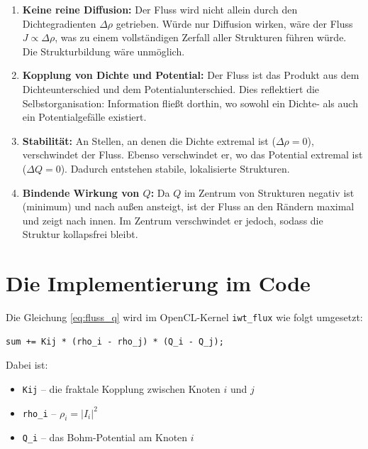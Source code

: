 \begin{enumerate}
    \item \textbf{Keine reine Diffusion:} Der Fluss wird nicht allein durch den Dichtegradienten 
    \( \Delta \rho \) getrieben. Würde nur Diffusion wirken, wäre der Fluss \( J \propto \Delta \rho \), 
    was zu einem vollständigen Zerfall aller Strukturen führen würde. Die Strukturbildung 
    wäre unmöglich.

    \item \textbf{Kopplung von Dichte und Potential:} Der Fluss ist das Produkt aus dem 
    Dichteunterschied und dem Potentialunterschied. Dies reflektiert die Selbstorganisation: 
    Information fließt dorthin, wo sowohl ein Dichte- als auch ein Potentialgefälle existiert.

    \item \textbf{Stabilität:} An Stellen, an denen die Dichte extremal ist (\( \Delta \rho = 0 \)), 
    verschwindet der Fluss. Ebenso verschwindet er, wo das Potential extremal ist 
    (\( \Delta Q = 0 \)). Dadurch entstehen stabile, lokalisierte Strukturen.

    \item \textbf{Bindende Wirkung von \( Q \):} Da \( Q \) im Zentrum von Strukturen negativ 
    ist (minimum) und nach außen ansteigt, ist der Fluss an den Rändern maximal und zeigt 
    nach innen. Im Zentrum verschwindet er jedoch, sodass die Struktur kollapsfrei bleibt.
\end{enumerate}

\section{Die Implementierung im Code}

Die Gleichung \ref{eq:fluss_q} wird im OpenCL-Kernel \texttt{iwt\_flux} wie folgt umgesetzt:

\begin{verbatim}
sum += Kij * (rho_i - rho_j) * (Q_i - Q_j);
\end{verbatim}

Dabei ist:
\begin{itemize}
    \item \texttt{Kij} – die fraktale Kopplung zwischen Knoten \( i \) und \( j \)
    \item \texttt{rho\_i} – \( \rho_i = |I_i|^2 \)
    \item \texttt{Q\_i} – das Bohm-Potential am Knoten \( i \)
\end{itemize}

